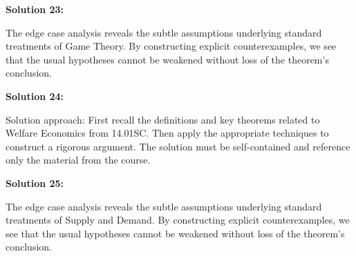 \documentclass[12pt,a4paper]{exam}
\begin{document}
\vspace{0.5cm}

\textbf{Solution 23:}

The edge case analysis reveals the subtle assumptions underlying standard treatments of Game Theory. By constructing explicit counterexamples, we see that the usual hypotheses cannot be weakened without loss of the theorem's conclusion.

\vspace{0.5cm}

\textbf{Solution 24:}

Solution approach: First recall the definitions and key theorems related to Welfare Economics from 14.01SC. Then apply the appropriate techniques to construct a rigorous argument. The solution must be self-contained and reference only the material from the course.

\vspace{0.5cm}

\textbf{Solution 25:}

The edge case analysis reveals the subtle assumptions underlying standard treatments of Supply and Demand. By constructing explicit counterexamples, we see that the usual hypotheses cannot be weakened without loss of the theorem's conclusion.

\vspace{0.5cm}
\end{document}
